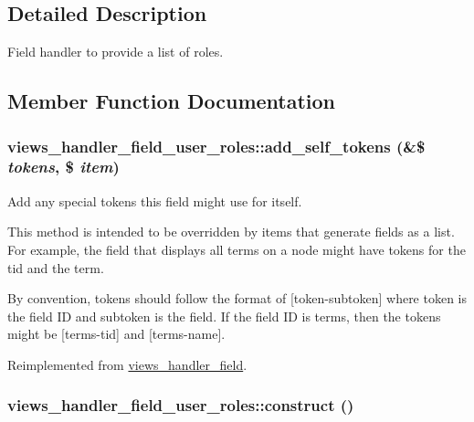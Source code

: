 \subsection{Detailed Description}
Field handler to provide a list of roles. 

\subsection{Member Function Documentation}
\hypertarget{classviews__handler__field__user__roles_ceb9ebe1ca046eec3634c85bb6b114f5}{
\subsubsection[{add\_\-self\_\-tokens}]{\setlength{\rightskip}{0pt plus 5cm}views\_\-handler\_\-field\_\-user\_\-roles::add\_\-self\_\-tokens (\&\$ {\em tokens}, \/  \$ {\em item})}}
\label{classviews__handler__field__user__roles_ceb9ebe1ca046eec3634c85bb6b114f5}


Add any special tokens this field might use for itself.

This method is intended to be overridden by items that generate fields as a list. For example, the field that displays all terms on a node might have tokens for the tid and the term.

By convention, tokens should follow the format of \mbox{[}token-subtoken\mbox{]} where token is the field ID and subtoken is the field. If the field ID is terms, then the tokens might be \mbox{[}terms-tid\mbox{]} and \mbox{[}terms-name\mbox{]}. 

Reimplemented from \hyperlink{classviews__handler__field_c61cc83a4c8c579993a254b5b1e16cbc}{views\_\-handler\_\-field}.\hypertarget{classviews__handler__field__user__roles_bf8254566ae390355b35d4593514b033}{
\subsubsection[{construct}]{\setlength{\rightskip}{0pt plus 5cm}views\_\-handler\_\-field\_\-user\_\-roles::construct ()}}
\label{classviews__handler__field__user__roles_bf8254566ae390355b35d4593514b033}


